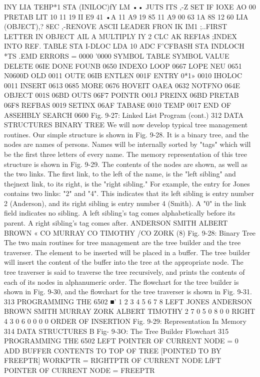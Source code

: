 \documentclass{book}
\begin{document}
{{{{{{{{{{{{{{{{{{{{{{{{{{{{{INY
LIA TEHP*1
STA (INILOC)fY
LM ••
JUTS ITS ,-Z SET IF IOXE
AO 00 PRETAB LIT 10
11 19
II
E9 41
•A
11
A9 19
85 11
A9 00
63 1A
8S 12
60
LIA (OBJECT),?
8EC ,-RENOVE ASCII LEADER FRON
IK IM1 ;..FIRST LETTER IN OBJECT
AIL A MULTIPLY IY 2
CLC
AK REFIA8 ;INDEX INTO REF. TABLE
STA I-DLOC
LDA 10
ADC F'CFBASH
STA INDLOCH
*TS
.EMD
ERRORS = 0000 '0000
SYMBOL TABLE
SYMBOL VALUE
DELETE 06IE DONE
FOUNB 0650 INDEXO
LOOP 0667 LOPE
NEU 0651 N0600D
OLD 0011 OUTE
06IB ENTLEN 001F ENTRY 0*1»
0010 IHOLOC 0011 INSERT 0613
0685 MORE 0676 HOVEIT OAEA
0632 NOTFNO 064E OBJECT 001S
06BD OUTS 06F7 POINTR O01J
PREINX 06BD PRETAB 06F8 REFBAS 0019
SETINX 06AF TABA8E 0010 TEMP 0017
END OF A8SEHBLY
SEARCH 0600
Fig. 9-27: Linked List Program (cont.)
312
DATA STRUCTURES
BINARY TREE
We will now develop typical tree management routines. Our simple
structure is shown in Fig. 9-28. It is a binary tree, and the nodes are
names of persons. Names will be internally sorted by "tags" which will
be the first three letters of every name. The memory representation of
this tree structure is shown in Fig. 9-29. The contents of the nodes are
shown, as well as the two links. The first link, to the left of the name, is
the "left sibling" and thejnext link, to its right, is the "right sibling."
For example, the entry for Jones contains two links: "2" and "4". This
indicates that its left sibling is entry number 2 (Anderson), and its right
sibling is entry number 4 (Smith). A "0" in the link field indicates no
sibling. A left sibling's tag comes alphabetically before its parent. A
right sibling's tag comes after.
ANDERSON SMITH
ALBERT BROWN
« CO
MURRAY
CO
TIMOTHY
/CO
ZORK
(8)
Fig. 9-28: Binary Tree
The two main routines for tree management are the tree builder
and the tree traverser. The element to be inserted will be placed in
a buffer. The tree builder will insert the content of the buffer into
the tree at the appropriate node. The tree traverser is said to
traverse the tree recursively, and prints the contents of each of its
nodes in alphanumeric order. The flowchart for the tree builder is
shown in Fig. 9-30, and the flowchart for the tree traverser is shown in
Fig. 9-31.
313
PROGRAMMING THE 6502
■'
1
2
3
4
5
6
7
8
LEFT
JONES
ANDERSON
BROWN
SMITH
MURRAY
ZORK
ALBERT
TIMOTHY
2
7
0
5
0
8
0
0
RIGHT
4
3
0
6
0
0
0
0
ORDER
OF INSERTION
Fig. 9-29: Representation In Memory
314
DATA STRUCTURES
B
Fig- 9-3O: The Tree Builder Flowchart
315
PROGRAMMING THE 6502
LEFT
POINTER OF
CURRENT
NODE = 0
ADD BUFFER
CONTENTS TO
TOP OF TREE
[POINTED TO
BY FREEPTR]
WORKPTR =
RIGHTPTR OF
CURRENT NODE
LfFT POINTER
OF CURRENT NODE
= FREEPTR
}}}}}}}}}}}}}}}}}}}}}}}}}}}}}
\end{document}
